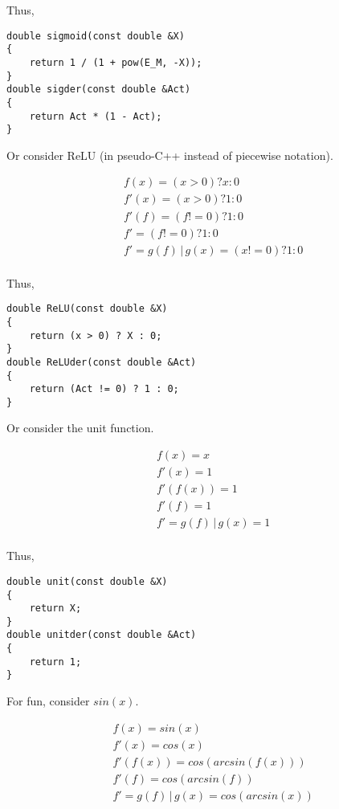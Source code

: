 \documentclass[8pt]{amsart}
\newcommand\where{\, \bigg \rvert \,}
\begin{document}
Thus,

\begin{verbatim}
double sigmoid(const double &X)
{
    return 1 / (1 + pow(E_M, -X));
}
double sigder(const double &Act)
{
    return Act * (1 - Act);
}
\end{verbatim}

Or consider ReLU (in pseudo-C++ instead of piecewise notation).

\[
    \begin{aligned}
        & f(x) = (x > 0) ? x : 0 \\
        & f'(x) = (x > 0) ? 1 : 0 \\
        & f'(f) = (f != 0) ? 1 : 0 \\
        & f' = (f != 0) ? 1 : 0 \\
        & f' = g(f) \where g(x) = (x != 0) ? 1 : 0 \\
    \end{aligned}
\]

Thus,

\begin{verbatim}
double ReLU(const double &X)
{
    return (x > 0) ? X : 0;
}
double ReLUder(const double &Act)
{
    return (Act != 0) ? 1 : 0;
}
\end{verbatim}

Or consider the unit function.

\[
    \begin{aligned}
        & f(x) = x \\
        & f'(x) = 1 \\
        & f'(f(x)) = 1 \\
        & f'(f) = 1 \\
        & f' = g(f) \where g(x) = 1 \\
    \end{aligned}
\]

Thus,

\begin{verbatim}
double unit(const double &X)
{
    return X;
}
double unitder(const double &Act)
{
    return 1;
}
\end{verbatim}

For fun, consider $sin(x)$.

\[
    \begin{aligned}
        & f(x) = sin(x) \\
        & f'(x) = cos(x) \\
        & f'(f(x)) = cos(arcsin(f(x))) \\
        & f'(f) = cos(arcsin(f)) \\
        & f' = g(f) \where g(x) = cos(arcsin(x)) \\
    \end{aligned}
\]
\end{document}
